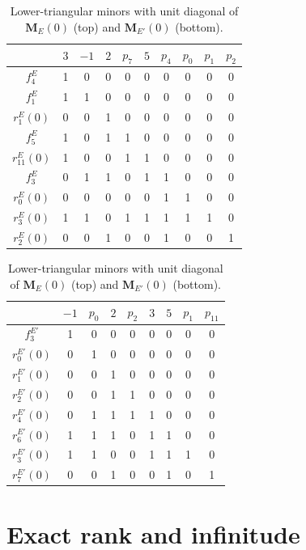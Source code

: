 \begin{table}[htbp]
\centering
\caption{Lower-triangular minors with unit diagonal of $\mathbf M_E(0)$ (top) and $\mathbf M_{E'}(0)$ (bottom).}\label{tab:r5-minors}
\renewcommand{\arraystretch}{1.15}
\begin{tabular}{c|ccccccccc}
& $3$ & $-1$ & $2$ & $p_7$ & $5$ & $p_4$ & $p_0$ & $p_1$ & $p_2$\\
\hline
$f^{E}_4$ & 1 & 0 & 0 & 0 & 0 & 0 & 0 & 0 & 0\\
$f^{E}_1$ & 1 & 1 & 0 & 0 & 0 & 0 & 0 & 0 & 0\\
$r^{E}_1(0)$ & 0 & 0 & 1 & 0 & 0 & 0 & 0 & 0 & 0\\
$f^{E}_5$ & 1 & 0 & 1 & 1 & 0 & 0 & 0 & 0 & 0\\
$r^{E}_{11}(0)$ & 1 & 0 & 0 & 1 & 1 & 0 & 0 & 0 & 0\\
$f^{E}_3$ & 0 & 1 & 1 & 0 & 1 & 1 & 0 & 0 & 0\\
$r^{E}_0(0)$ & 0 & 0 & 0 & 0 & 0 & 1 & 1 & 0 & 0\\
$r^{E}_3(0)$ & 1 & 1 & 0 & 1 & 1 & 1 & 1 & 1 & 0\\
$r^{E}_2(0)$ & 0 & 0 & 1 & 0 & 0 & 1 & 0 & 0 & 1\\
\end{tabular}

\medskip
\begin{tabular}{c|cccccccc}
& $-1$ & $p_0$ & $2$ & $p_2$ & $3$ & $5$ & $p_1$ & $p_{11}$\\
\hline
$f^{E'}_3$ & 1 & 0 & 0 & 0 & 0 & 0 & 0 & 0\\
$r^{E'}_0(0)$ & 0 & 1 & 0 & 0 & 0 & 0 & 0 & 0\\
$r^{E'}_1(0)$ & 0 & 0 & 1 & 0 & 0 & 0 & 0 & 0\\
$r^{E'}_2(0)$ & 0 & 0 & 1 & 1 & 0 & 0 & 0 & 0\\
$r^{E'}_4(0)$ & 0 & 1 & 1 & 1 & 1 & 0 & 0 & 0\\
$r^{E'}_6(0)$ & 1 & 1 & 1 & 0 & 1 & 1 & 0 & 0\\
$r^{E'}_3(0)$ & 1 & 1 & 0 & 0 & 1 & 1 & 1 & 0\\
$r^{E'}_7(0)$ & 0 & 0 & 1 & 0 & 0 & 1 & 0 & 1\\
\end{tabular}
\end{table}

\section{Exact rank and infinitude}\label{sec:r5-theorem}

